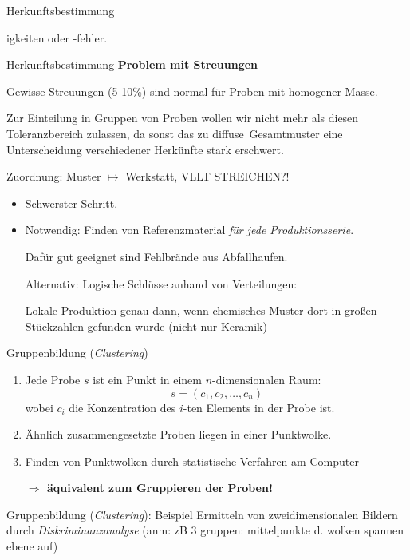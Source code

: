 \documentclass[xcolor=dvipsnames, aspectratio=169]{beamer}
\begin{document}
\begin{frame}{Herkunftsbestimmung}
\begin{itemize}[<+->]
igkeiten oder -fehler.
\end{itemize}
\end{frame}

\begin{frame}{Herkunftsbestimmung}
\textbf{Problem mit Streuungen}

Gewisse Streuungen (5-10\%) sind normal für Proben mit homogener Masse.

Zur Einteilung in Gruppen von Proben wollen wir nicht mehr als diesen Toleranzbereich zulassen, da sonst das zu \glqq diffuse\grqq\ Gesamtmuster eine Unterscheidung verschiedener Herkünfte stark erschwert.
\end{frame}

\begin{frame}{Zuordnung: Muster $\mapsto$ Werkstatt, VLLT STREICHEN?!}
\begin{itemize}
\item Schwerster Schritt.
\item Notwendig: Finden von Referenzmaterial \textit{für jede Produktionsserie}.

Dafür gut geeignet sind \alert{Fehlbrände} aus Abfallhaufen.\medskip\pause

Alternativ: Logische Schlüsse anhand von \alert{Verteilungen}:

Lokale Produktion genau dann, wenn chemisches Muster dort in großen Stückzahlen gefunden wurde (nicht nur Keramik)
\end{itemize}
\end{frame}

\begin{frame}[<+->]{Gruppenbildung (\emph{Clustering})}
\begin{enumerate}[(1)]
\item Jede Probe $s$ ist ein \alert{Punkt} in einem $n$-dimensionalen Raum: \[s=(c_1,c_2,\dots,c_n)\] wobei $c_i$ die Konzentration des $i$-ten Elements in der Probe ist.
\item Ähnlich zusammengesetzte Proben liegen in einer \alert{Punktwolke}.
\item Finden von Punktwolken durch statistische Verfahren am Computer

\textbf{$\Rightarrow$ äquivalent zum Gruppieren der Proben!}
\end{enumerate}
\end{frame}

\begin{frame}[<+->]{Gruppenbildung (\emph{Clustering}): Beispiel}
Ermitteln von zweidimensionalen Bildern durch \emph{Diskriminanzanalyse} (anm: zB 3 gruppen: mittelpunkte d. wolken spannen ebene auf)
\end{frame}
\end{document}
